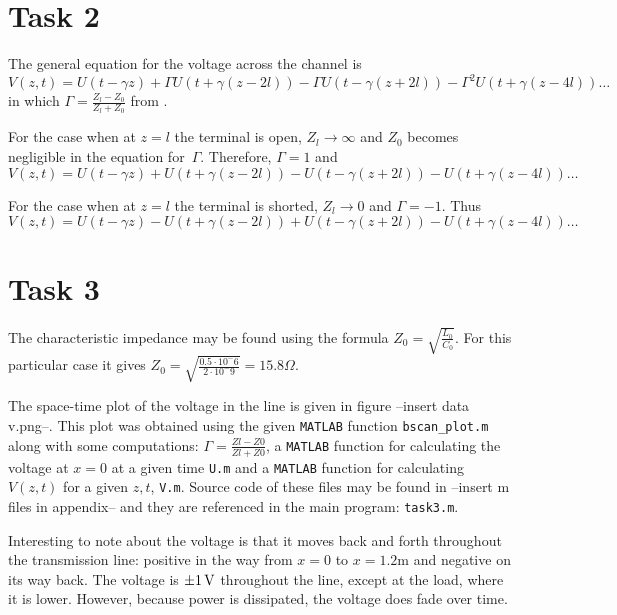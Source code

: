 \documentclass[11pt,titlepage]{report}
\begin{document}
\section{Task 2}
The general equation for the voltage across the channel is 
\begin{equation}
V(z,t)=U(t-\gamma z) + \Gamma U(t+\gamma(z-2l))-\Gamma U(t-\gamma(z+2l))-\Gamma^2U(t+\gamma(z-4l))\dots
\end{equation}
in which $\Gamma=\frac{Z_l-Z_0}{Z_l+Z_0}$ from \cite[64]{epo4-manual}.

For the case when at $z=l$ the terminal is open, $Z_l \to \infty$ and $Z_0$ becomes negligible in the equation for~$\Gamma$. Therefore, $\Gamma=1$ and 
\begin{equation}
V(z,t)=U(t-\gamma z) + U(t+\gamma(z-2l))- U(t-\gamma(z+2l))- U(t+\gamma(z-4l))\dots
\end{equation}

For the case when at $z=l$ the terminal is shorted, $Z_l \to 0$ and $\Gamma=-1$. Thus 
\begin{equation}
V(z,t)=U(t-\gamma z) - U(t+\gamma(z-2l))+U(t-\gamma(z+2l))-U(t+\gamma(z-4l))\dots
\end{equation}


\section{Task 3}
The characteristic impedance may be found using the formula $Z_0=\sqrt{\frac{L_0}{C_0}}$. For this particular case it gives $Z_0=\sqrt{\frac{0.5\cdot10^-6}{2\cdot10^-9}}=15.8\Omega$. 

The space-time plot of the voltage in the line is given in figure --insert data v.png--. This plot was obtained using the given \texttt{MATLAB} function \texttt{bscan\_plot.m} along with some computations: $\Gamma=\frac{Zl-Z0}{Zl+Z0}$, a \texttt{MATLAB} function for calculating the voltage at $x=0$ at a given time \texttt{U.m} and a \texttt{MATLAB} function for calculating $V(z,t)$ for a given $z,t$, \texttt{V.m}. Source code of these files may be found in --insert m files in appendix-- and they are referenced in the main program: \texttt{task3.m}.

Interesting to note about the voltage is that it moves back and forth throughout the transmission line: positive in the way from $x=0$ to $x=1.2$m and negative on its way back. The voltage is $\SI{\pm1}{V}$ throughout the line, except at the load, where it is lower. However, because power is dissipated, the voltage does fade over time.
\end{document}
